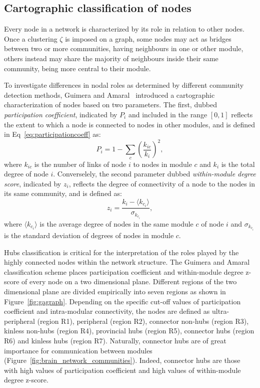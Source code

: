 \documentclass[11pt,              a4paper,              twoside,openright,              titlepage,              headinclude,footinclude,                            numbers=noenddot,              cleardoublepage=empty,]{scrreprt}
\begin{document}
\subsection{Cartographic classification of nodes}
Every node in a network is characterized by its role in relation to other nodes.
Once a clustering $\zeta$ is imposed on a graph, some nodes may act as bridges between two or more communities, having neighbours in one or other module, others instead may share the majority of neighbours inside their same community, being more central to their module.

To investigate differences in nodal roles as determined by different community detection methods, Guimera and Amaral~\cite{guimera2005} introduced a cartographic characterization of nodes based on two parameters.
The first, dubbed \emph{participation coefficient}, indicated by $P_i$ and included in the range $[0,1]$ reflects the extent to which a node is connected to nodes in other modules, and is defined in Eq~\ref{eq:participationcoeff} as:
\begin{equation}\label{eq:participationcoeff}
P_i = 1 - \sum_c \left( \frac{k_{ic}}{k_i} \right)^2,
\end{equation}
where $k_{ic}$ is the number of links of node $i$ to nodes in module $c$ and $k_i$ is the total degree of node $i$.
Converselely, the second parameter dubbed \emph{within-module degree score}, indicated by $z_i$,  reflects the degree of connectivity of a node to the nodes in its same community, and is defined as: 
\begin{equation}\label{eq:withinmoduledegree}
z_i = \frac{k_i - \langle  k_{c_i} \rangle }{\sigma_{k_{c_i}}},
\end{equation}
where $\langle  k_{c_i} \rangle $ is the average degree of nodes in the same module $c$ of node $i$ and $\sigma_{k_{c_i}}$ is the standard deviation of degrees of nodes in module $c$.

Hubs classification is critical for the interpretation of the roles played by the highly connected nodes within the network structure.
The Guimera and Amaral~\cite{guimera2005} classification scheme places participation coefficient and within-module degree z-score of every node on a two dimensional plane.
Different regions of the two dimensional plane are divided empirically into seven regions as shown in Figure~\ref{fig:gagraph}.
Depending on the specific cut-off values of participation coefficient and intra-modular connectivity, the nodes are defined as ultra-peripheral (region R1), peripheral (region R2), connector non-hubs (region R3), kinless non-hubs (region R4), provincial hubs (region R5), connector hubs (region R6) and kinless hubs (region R7).
Naturally, connector hubs are of great importance for communication between modules (Figure~\ref{fig:brain_network_communities}).
Indeed, connector hubs are those with high values of participation coefficient and high values of within-module degree z-score.
\end{document}
